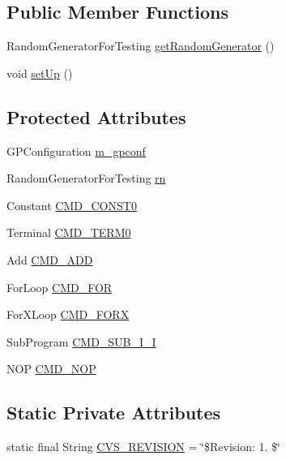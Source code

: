 \subsection*{Public Member Functions}
\begin{DoxyCompactItemize}
\item 
Random\-Generator\-For\-Testing \hyperlink{classorg_1_1jgap_1_1gp_1_1_g_p_test_case_ab3eea24ea6466bf8c54e98ffc45546d7}{get\-Random\-Generator} ()
\item 
void \hyperlink{classorg_1_1jgap_1_1gp_1_1_g_p_test_case_a4a091c74da74b780472de517aef3e3b6}{set\-Up} ()
\end{DoxyCompactItemize}
\subsection*{Protected Attributes}
\begin{DoxyCompactItemize}
\item 
G\-P\-Configuration \hyperlink{classorg_1_1jgap_1_1gp_1_1_g_p_test_case_a5c64d356cfbd17b5f87d789091061185}{m\-\_\-gpconf}
\item 
Random\-Generator\-For\-Testing \hyperlink{classorg_1_1jgap_1_1gp_1_1_g_p_test_case_ab0dd5945056461ec655ebda0f7bc19ea}{rn}
\item 
Constant \hyperlink{classorg_1_1jgap_1_1gp_1_1_g_p_test_case_ab33f5fe9e1dc9db8b7165d7429e27dbc}{C\-M\-D\-\_\-\-C\-O\-N\-S\-T0}
\item 
Terminal \hyperlink{classorg_1_1jgap_1_1gp_1_1_g_p_test_case_abf3465628e8f1fb05af5309c3e54be0f}{C\-M\-D\-\_\-\-T\-E\-R\-M0}
\item 
Add \hyperlink{classorg_1_1jgap_1_1gp_1_1_g_p_test_case_a412e7c4b66ec6bd20169302767e0eeac}{C\-M\-D\-\_\-\-A\-D\-D}
\item 
For\-Loop \hyperlink{classorg_1_1jgap_1_1gp_1_1_g_p_test_case_af0b86b0228a8380bfe8bbb749718256c}{C\-M\-D\-\_\-\-F\-O\-R}
\item 
For\-X\-Loop \hyperlink{classorg_1_1jgap_1_1gp_1_1_g_p_test_case_afceeb3c201cfeeaf8f3a5336d0dbb63b}{C\-M\-D\-\_\-\-F\-O\-R\-X}
\item 
Sub\-Program \hyperlink{classorg_1_1jgap_1_1gp_1_1_g_p_test_case_a61b6e3722a9804036ba913c8a717d1d9}{C\-M\-D\-\_\-\-S\-U\-B\-\_\-\-I\-\_\-\-I}
\item 
N\-O\-P \hyperlink{classorg_1_1jgap_1_1gp_1_1_g_p_test_case_a3a9bc4b6209f17613203db19f0f249cc}{C\-M\-D\-\_\-\-N\-O\-P}
\end{DoxyCompactItemize}
\subsection*{Static Private Attributes}
\begin{DoxyCompactItemize}
\item 
static final String \hyperlink{classorg_1_1jgap_1_1gp_1_1_g_p_test_case_ac95afe493701e26eee1fc31d6b4b5406}{C\-V\-S\-\_\-\-R\-E\-V\-I\-S\-I\-O\-N} = \char`\"{}\$Revision\-: 1. \$\char`\"{}
\end{DoxyCompactItemize}
